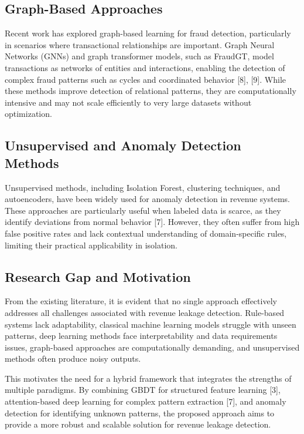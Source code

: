 \documentclass[conference]{IEEEtran}
\begin{document}
\subsection{Graph-Based Approaches}
Recent work has explored graph-based learning for fraud detection, particularly in scenarios where transactional relationships are important. Graph Neural Networks (GNNs) and graph transformer models, such as FraudGT, model transactions as networks of entities and interactions, enabling the detection of complex fraud patterns such as cycles and coordinated behavior [8], [9]. While these methods improve detection of relational patterns, they are computationally intensive and may not scale efficiently to very large datasets without optimization.

\subsection{Unsupervised and Anomaly Detection Methods}
Unsupervised methods, including Isolation Forest, clustering techniques, and autoencoders, have been widely used for anomaly detection in revenue systems. These approaches are particularly useful when labeled data is scarce, as they identify deviations from normal behavior [7]. However, they often suffer from high false positive rates and lack contextual understanding of domain-specific rules, limiting their practical applicability in isolation.

\subsection{Research Gap and Motivation}
From the existing literature, it is evident that no single approach effectively addresses all challenges associated with revenue leakage detection. Rule-based systems lack adaptability, classical machine learning models struggle with unseen patterns, deep learning methods face interpretability and data requirements issues, graph-based approaches are computationally demanding, and unsupervised methods often produce noisy outputs.

This motivates the need for a hybrid framework that integrates the strengths of multiple paradigms. By combining GBDT for structured feature learning [3], attention-based deep learning for complex pattern extraction [7], and anomaly detection for identifying unknown patterns, the proposed approach aims to provide a more robust and scalable solution for revenue leakage detection.

\end{document}
